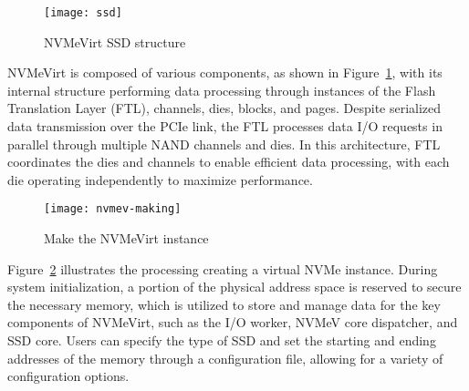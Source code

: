 \begin{figure}[t]
    \centering
    \texttt{[image: ssd]}
    \caption{NVMeVirt SSD structure}
    \label{fig:structure}
\end{figure}


NVMeVirt is composed of various components, as shown in Figure~\ref{fig:structure}, with its internal structure performing data processing through instances of the Flash Translation Layer (FTL), channels, dies, blocks, and pages.
Despite serialized data transmission over the PCIe link, the FTL processes data I/O requests in parallel through multiple NAND channels and dies.
In this architecture, FTL coordinates the dies and channels to enable efficient data processing, with each die operating independently to maximize performance.


\begin{figure}[t]
    \centering
    \texttt{[image: nvmev-making]}
    \caption{Make the NVMeVirt instance}
    \label{fig:making}
\end{figure}



Figure~\ref{fig:making} illustrates the processing creating a virtual NVMe instance.
During system initialization, a portion of the physical address space is reserved to secure the necessary memory, which is utilized to store and manage data for the key components of NVMeVirt, such as the I/O worker, NVMeV core dispatcher, and SSD core.
Users can specify the type of SSD and set the starting and ending addresses of the memory through a configuration file, allowing for a variety of configuration options.

